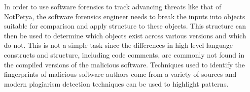 \documentclass[12pt]{report}
\begin{document}

In order to use software forensics to track advancing threats like that of NotPetya, the software forensics engineer needs to break the inputs into objects suitable for comparison and apply structure to these objects.  This structure can then be used to determine which objects exist across various versions and which do not.  This is not a simple task since the differences in high-level language constructs and structure, including code comments, are commonly not found in the compiled versions of the malicious software.  Techniques used to identify the fingerprints of malicious software authors come from a variety of sources and modern plagiarism detection techniques can be used to highlight patterns. 
\end{document}
